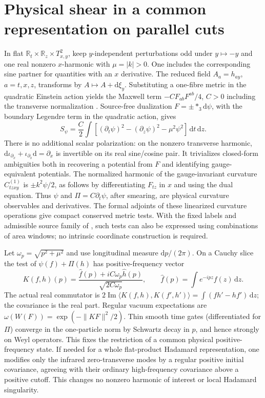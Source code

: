 \documentclass[11pt]{article}
\newcommand{\dd}{\mathrm d}
\begin{document}
\section{Physical shear in a common representation on parallel cuts}

In flat \(\mathbb R_t\times\mathbb R_z\times T^2_{x,y}\), keep \(y\)-independent perturbations odd under \(y\mapsto-y\) and one real nonzero \(x\)-harmonic with \(\mu=|k|>0\). One includes the corresponding sine partner for quantities with an \(x\) derivative. The reduced field \(A_a=h_{ay}\), \(a=t,x,z\), transforms by \(A\mapsto A+\dd\xi_y\). Substituting a one-fibre metric in the quadratic Einstein action yields the Maxwell term \(-C F_{ab}F^{ab}/4\), \(C>0\) including the transverse normalization \cite{sewing}. Source-free dualization \(F=\pm *_3\dd\psi\), with the boundary Legendre term in the quadratic action, gives
\[
 S_\psi=\frac C2\int[(\partial_t\psi)^2-(\partial_z\psi)^2-\mu^2\psi^2]\,\dd t\,\dd z .
\]
There is no additional scalar polarization: on the nonzero transverse harmonic, \(\dd\iota_{\partial_x}+\iota_{\partial_x}\dd=\partial_x\) is invertible on its real sine/cosine pair. It trivializes closed-form ambiguities both in recovering a potential from \(F\) and identifying gauge-equivalent potentials. The normalized harmonic of the gauge-invariant curvature \(C^{(1)}_{tzxy}\) is \(\pm k^2\psi/2\), as follows by differentiating \(F_{tz}\) in \(x\) and using the dual equation. Thus \(\psi\) and \(\Pi=C\partial_t\psi\), after smearing, are physical curvature observables and derivatives. The formal adjoints of these linearized curvature operations give compact conserved metric tests. With the fixed labels and admissible source family of \cite{area}, such tests can also be expressed using combinations of area windows; no intrinsic coordinate construction is required.

Let \(\omega_p=\sqrt{p^2+\mu^2}\) and use longitudinal measure \(\dd p/(2\pi)\). On a Cauchy slice the test of \(\psi(f)+\Pi(h)\) has positive-frequency vector
\[
 K(f,h)(p)=\frac{\widehat f(p)+iC\omega_p\widehat h(p)}{\sqrt{2C\omega_p}},
 \qquad \widehat f(p)=\int e^{-ipz}f(z)\,\dd z .
\]
The actual real commutator is \(2\operatorname{Im}\langle K(f,h),K(f',h')\rangle
=\int(fh'-hf')\,\dd z\); the covariance is the real part. Regular vacuum expectations are \(\omega(W(F))=\exp(-\|KF\|^2/2)\). Thin smooth time gates (differentiated for \(\Pi\)) converge in the one-particle norm by Schwartz decay in \(p\), and hence strongly on Weyl operators. This fixes the restriction of a common physical positive-frequency state. If needed for a whole flat-product Hadamard representation, one modifies only the infrared zero-transverse modes by a regular positive initial covariance, agreeing with their ordinary high-frequency covariance above a positive cutoff. This changes no nonzero harmonic of interest or local Hadamard singularity.
\end{document}
